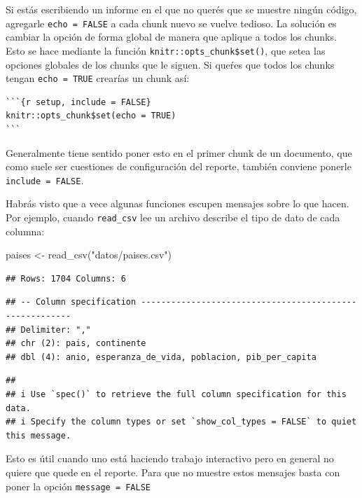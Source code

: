 \documentclass[
  openany]{book}
\newenvironment{Shaded}{\begin{snugshade}}{\end{snugshade}}
\newcommand{\FunctionTok}[1]{\textcolor[rgb]{0.00,0.00,0.00}{#1}}
\newcommand{\NormalTok}[1]{#1}
\newcommand{\OtherTok}[1]{\textcolor[rgb]{0.56,0.35,0.01}{#1}}
\newcommand{\StringTok}[1]{\textcolor[rgb]{0.31,0.60,0.02}{#1}}
\begin{document}
Si estás escribiendo un informe en el que no querés que se muestre ningún código, agregarle \texttt{echo\ =\ FALSE} a cada chunk nuevo se vuelve tedioso. La solución es cambiar la opción de forma global de manera que aplique a todos los chunks. Esto se hace mediante la función \texttt{knitr::opts\_chunk\$set()}, que setea las opciones globales de los chunks que le siguen. Si queŕes que todos los chunks tengan \texttt{echo\ =\ TRUE} crearías un chunk así:

\begin{verbatim}
```{r setup, include = FALSE}
knitr::opts_chunk$set(echo = TRUE)
```
\end{verbatim}

Generalmente tiene sentido poner esto en el primer chunk de un documento, que como suele ser cuestiones de configuración del reporte, también conviene ponerle \texttt{include\ =\ FALSE}.

Habrás visto que a vece algunas funciones escupen mensajes sobre lo que hacen. Por ejemplo, cuando \texttt{read\_csv} lee un archivo describe el tipo de dato de cada columna:

\begin{Shaded}
\begin{Highlighting}[]
\NormalTok{paises }\OtherTok{\textless{}{-}} \FunctionTok{read\_csv}\NormalTok{(}\StringTok{"datos/paises.csv"}\NormalTok{)}
\end{Highlighting}
\end{Shaded}

\begin{verbatim}
## Rows: 1704 Columns: 6
\end{verbatim}

\begin{verbatim}
## -- Column specification --------------------------------------------------------
## Delimiter: ","
## chr (2): pais, continente
## dbl (4): anio, esperanza_de_vida, poblacion, pib_per_capita
\end{verbatim}

\begin{verbatim}
## 
## i Use `spec()` to retrieve the full column specification for this data.
## i Specify the column types or set `show_col_types = FALSE` to quiet this message.
\end{verbatim}

Esto es útil cuando uno está haciendo trabajo interactivo pero en general no quiere que quede en el reporte. Para que no muestre estos mensajes basta con poner la opción \texttt{message\ =\ FALSE}
\end{document}
